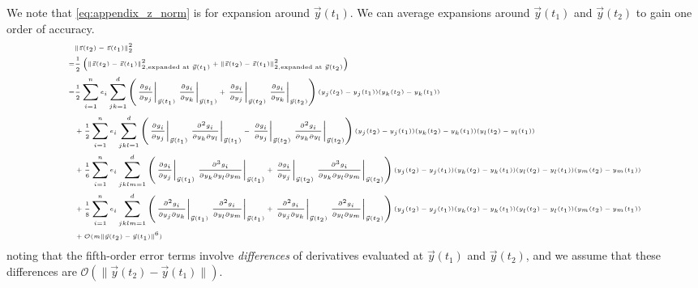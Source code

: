 \documentclass[12pt]{article}
\begin{document}
We note that \eqref{eq:appendix_z_norm} is for expansion around $\vec{y}(t_1)$. 
%
We can average expansions around $\vec{y}(t_1)$ and $\vec{y}(t_2)$ to gain one order of accuracy. 
%
\begin{equation} \label{eq:mahalanobis_taylor_explansion}
\tiny
\begin{aligned}
& \|\vec{z}(t_2) - \vec{z}(t_1)\|_2^2 \\
=& \frac{1}{2} \left( \|\vec{z}(t_2) - \vec{z}(t_1)\|_{2, \text{expanded at } \vec{y}(t_1)}^2  + \|\vec{z}(t_2) - \vec{z}(t_1)\|_{2, \text{expanded at } \vec{y}(t_2)}^2 \right) \\
=& \frac{1}{2} \sum_{i=1}^n e_i \sum_{jk=1}^d \left( \left. \frac{\partial g_i}{\partial y_j} \right|_{\vec{y}(t_1)} \left. \frac{\partial g_i}{\partial y_k} \right|_{\vec{y}(t_1)} + \left. \frac{\partial g_i}{\partial y_j} \right|_{\vec{y}(t_2)} \left. \frac{\partial g_i}{\partial y_k} \right|_{\vec{y}(t_2)} \right) (y_j(t_2)-y_j(t_1)) (y_k(t_2)-y_k(t_1)) \\
&+ \frac{1}{2} \sum_{i=1}^n e_i \sum_{jkl=1}^d \left( \left. \frac{\partial g_i}{\partial y_j} \right|_{\vec{y}(t_1)} \left. \frac{\partial^2 g_i}{\partial y_k \partial y_l} \right|_{\vec{y}(t_1)} - \left. \frac{\partial g_i}{\partial y_j} \right|_{\vec{y}(t_2)} \left. \frac{\partial^2 g_i}{\partial y_k \partial y_l} \right|_{\vec{y}(t_2)} \right) (y_j(t_2)-y_j(t_1))  (y_k(t_2)-y_k(t_1)) (y_l(t_2)-y_l(t_1)) \\
&+ \frac{1}{6} \sum_{i=1}^n e_i \sum_{jklm=1}^d \left( \left. \frac{\partial g_i}{\partial y_j} \right|_{\vec{y}(t_1)} \left. \frac{\partial^3 g_i}{ \partial y_k \partial y_l \partial y_m} \right|_{\vec{y}(t_1)} + \left. \frac{\partial g_i}{\partial y_j} \right|_{\vec{y}(t_2)} \left. \frac{\partial^3 g_i}{ \partial y_k \partial y_l \partial y_m} \right|_{\vec{y}(t_2)} \right) (y_j(t_2)-y_j(t_1)) (y_k(t_2)-y_k(t_1)) (y_l(t_2)-y_l(t_1))(y_m(t_2)-y_m(t_1)) \\
&+ \frac{1}{8} \sum_{i=1}^n e_i \sum_{jklm=1}^d \left( \left. \frac{\partial^2 g_i}{\partial y_j \partial y_k} \right|_{\vec{y}(t_1)} \left. \frac{\partial^2 g_i}{\partial y_l \partial y_m} \right|_{\vec{y}(t_1)} + \left. \frac{\partial^2 g_i}{\partial y_j \partial y_k} \right|_{\vec{y}(t_2)} \left. \frac{\partial^2 g_i}{\partial y_l \partial y_m} \right|_{\vec{y}(t_2)} \right) (y_j(t_2)-y_j(t_1)) (y_k(t_2)-y_k(t_1)) (y_l(t_2)-y_l(t_1)) (y_m(t_2)-y_m(t_1)) \\
&+ \mathcal{O}(m \|\vec{y}(t_2) - \vec{y}(t_1) \|^6)
\end{aligned}
\end{equation}
%
noting that the fifth-order error terms involve {\em differences} of derivatives evaluated at $\vec{y}(t_1)$ and $\vec{y}(t_2)$, and we assume that these differences are $\mathcal{O} (\| \vec{y}(t_2) - \vec{y}(t_1) \|)$. 
\end{document}
